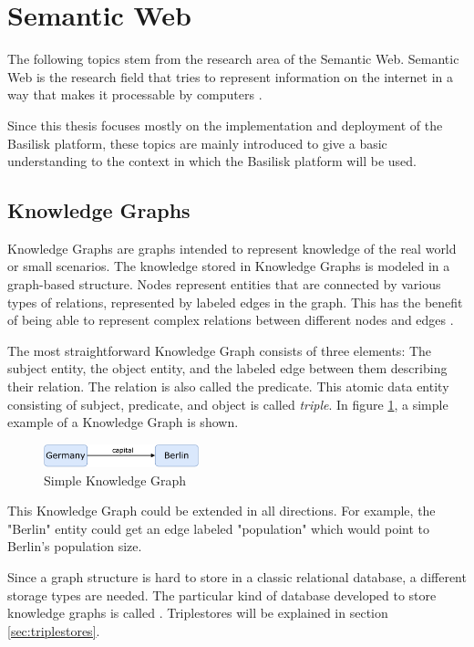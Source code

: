\section{Semantic Web}
\label{sec:sw_topics}
The following topics stem from the research area of the Semantic Web.
Semantic Web is the research field that tries to represent information on the internet in a way that makes it processable by computers \cite{hitzlerSemanticWebGrundlagen2008}.

Since this thesis focuses mostly on the implementation and deployment of the Basilisk platform, these topics are mainly introduced to give a basic understanding to the context in which the Basilisk platform will be used.

\subsection{Knowledge Graphs} 
\label{sec:knowledge_graphs}
Knowledge Graphs are graphs intended to represent knowledge of the real world or small scenarios.
The knowledge stored in Knowledge Graphs is modeled in a graph-based structure. 
Nodes represent entities that are connected by various types of relations, represented by labeled edges in the graph.
This has the benefit of being able to represent complex relations between different nodes and edges \cite{hoganKnowledgeGraphs2021}.

The most straightforward Knowledge Graph consists of three elements:
The subject entity, the object entity, and the labeled edge between them describing their relation.
The relation is also called the predicate.
This atomic data entity consisting of subject, predicate, and object is called \emph{triple}.
In figure \ref{fig:example-knowledge-graph}, a simple example of a Knowledge Graph is shown.

\begin{figure}[tbph]
	\centering
	\includegraphics[width=0.4\textwidth]{figures/knowledge-graph-diagram}
	\caption{Simple Knowledge Graph}
	\label{fig:example-knowledge-graph}
\end{figure}

This Knowledge Graph could be extended in all directions.
For example, the "Berlin" entity could get an edge labeled "population" which would point to Berlin's population size.

Since a graph structure is hard to store in a classic relational database, a different storage types are needed.
The particular kind of database developed to store knowledge graphs is called \tsp{}.
Triplestores will be explained in section \ref{sec:triplestores}.


